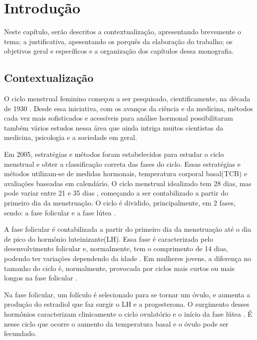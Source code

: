 \chapter[Introdução]{Introdução}

Neste capítulo, serão descritos a contextualização, apresentando brevemente o tema; a justificativa, apesentando os porquês da elaboração do trabalho; os objetivos geral e específicos e a organização dos capítulos dessa monografia.

\section{Contextualização}

O ciclo menstrual feminino começou a ser pesquisado, cientificamente, na década de 1930 \cite{frank1931}.
Desde essa iniciativa, com os avanços da ciência e da medicina, métodos cada vez mais sofisticados e 
acessíveis para análise hormonal possibilitaram também vários estudos nessa área que ainda intriga 
muitos cientistas da medicina, psicologia e a sociedade em geral.


Em 2005, estratégias e métodos foram estabelecidos para estudar o ciclo menstrual e obter a 
classificação correta das fases do ciclo\cite{becker2005}.
Essas estratégias e métodos utilizam-se de medidas hormonais, temperatura corporal basal(TCB) e 
avaliações baseadas em calendário. O ciclo menstrual idealizado tem 28 dias, mas pode variar entre 21 
e 35 dias \cite{lenton1984a}, começando a ser contabilizado a partir do primeiro dia da menstruação. 
O ciclo é dividido, principalmente, em 2 fases, sendo: a fase folicular e a fase lútea 
\cite{brondin2008}.


A fase folicular é contabilizada a partir do primeiro dia da menstruação até o dia de pico do hormônio 
luteinizante(LH). Essa fase é caracterizada pelo desenvolvimento folicular e, normalmente, tem o comprimento de 14 
dias, podendo ter variações dependendo da idade \cite{lenton1984a}. Em mulheres jovens, a diferença no 
tamanho do ciclo é, normalmente, provocada por ciclos mais curtos ou mais longos na fase folicular \cite{lenton1984a}.


Na fase folicular, um folículo é selecionado para se tornar um óvulo, e aumenta a produção do estradiol
que faz surgir o LH e a progesterona. O surgimento desses hormônios caracterizam clinicamente o ciclo 
ovulatório e o início da fase lútea \cite{fritz2010}. É nesse ciclo que ocorre o aumento da temperatura
basal e o óvulo pode ser fecundado. 


